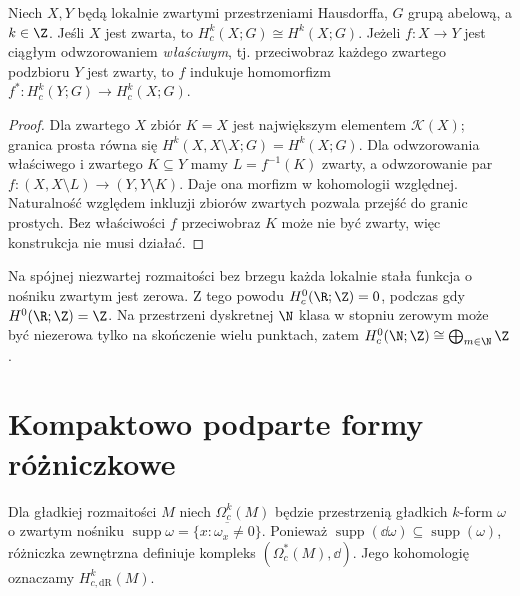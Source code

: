 \begin{stwierdzenie}
\label{prop:compact-proper-v11}
Niech $X,Y$ będą lokalnie zwartymi przestrzeniami Hausdorffa,
$G$ grupą abelową, a $k\in\Z$.
Jeśli $X$ jest zwarta, to $H_c^k(X;G)\cong H^k(X;G)$.
Jeżeli $f:X\to Y$ jest ciągłym odwzorowaniem \emph{właściwym},
tj. przeciwobraz każdego zwartego podzbioru $Y$ jest zwarty,
to $f$ indukuje homomorfizm
$f^*:H_c^k(Y;G)\to H_c^k(X;G)$.
\end{stwierdzenie}
\begin{proof}
Dla zwartego $X$ zbiór $K=X$ jest największym elementem
$\mathcal K(X)$; granica prosta równa się
$H^k(X,X\setminus X;G)=H^k(X;G)$.
Dla odwzorowania właściwego i zwartego $K\subseteq Y$ mamy
$L=f^{-1}(K)$ zwarty, a odwzorowanie par
$f:(X,X\setminus L)\to(Y,Y\setminus K)$.
Daje ona morfizm w kohomologii względnej. Naturalność
względem inkluzji zbiorów zwartych pozwala przejść
do granic prostych. Bez właściwości $f$ przeciwobraz
$K$ może nie być zwarty, więc konstrukcja nie musi działać.
\end{proof}

\begin{przyklad}[Dlaczego $H_c^0(\R)=0$?]
Na spójnej niezwartej rozmaitości bez brzegu
każda lokalnie stała funkcja o nośniku zwartym jest zerowa.
Z tego powodu $H_c^0(\R;\Z)=0$, podczas gdy
$H^0(\R;\Z)=\Z$. Na przestrzeni dyskretnej $\N$
klasa w stopniu zerowym może być niezerowa tylko na
skończenie wielu punktach, zatem
$H_c^0(\N;\Z)\cong\bigoplus_{m\in\N}\Z$.
\end{przyklad}

\section{Kompaktowo podparte formy różniczkowe}
\begin{definicja}
Dla gładkiej rozmaitości $M$ niech $\Omega_c^k(M)$ będzie
przestrzenią gładkich $k$-form $\omega$ o zwartym nośniku
$\operatorname{supp}\omega=\overline{\{x:\omega_x\ne0\}}$.
Ponieważ $\operatorname{supp}(\dd\omega)\subseteq
\operatorname{supp}(\omega)$, różniczka zewnętrzna definiuje
kompleks $(\Omega_c^*(M),\dd)$. Jego kohomologię oznaczamy
$H_{c,\mathrm{dR}}^k(M)$.
\end{definicja}

